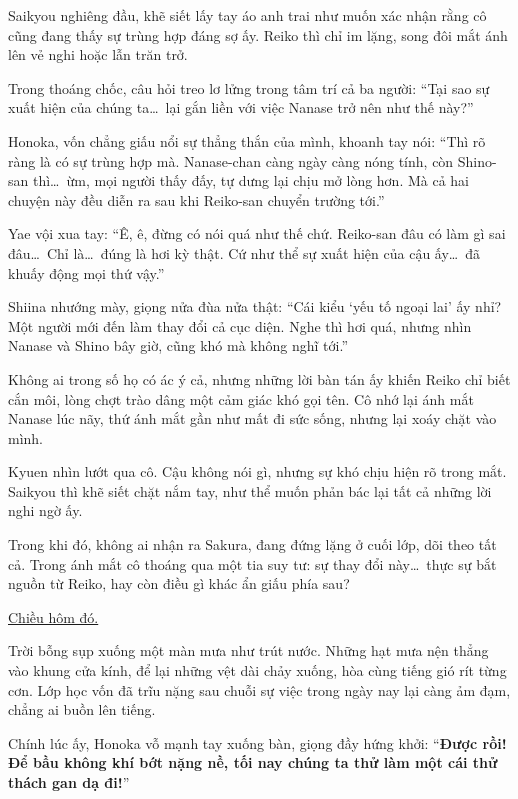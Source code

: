 \documentclass[../main.tex]{subfiles}
\begin{document}
Saikyou nghiêng đầu, khẽ siết lấy tay áo anh trai như muốn xác nhận rằng cô cũng đang thấy sự trùng hợp đáng sợ ấy. Reiko thì chỉ im lặng, song đôi mắt ánh lên vẻ nghi hoặc lẫn trăn trở.

Trong thoáng chốc, câu hỏi treo lơ lửng trong tâm trí cả ba người: ``Tại sao sự xuất hiện của chúng ta\dots\ lại gắn liền với việc Nanase trở nên như thế này?''

Honoka, vốn chẳng giấu nổi sự thẳng thắn của mình, khoanh tay nói: ``Thì rõ ràng là có sự trùng hợp mà. Nanase-chan càng ngày càng nóng tính, còn Shino-san thì\dots\ ừm, mọi người thấy đấy, tự dưng lại chịu mở lòng hơn. Mà cả hai chuyện này đều diễn ra sau khi Reiko-san chuyển trường tới.''

Yae vội xua tay: ``Ê, ê, đừng có nói quá như thế chứ. Reiko-san đâu có làm gì sai đâu\dots\ Chỉ là\dots\ đúng là hơi kỳ thật. Cứ như thể sự xuất hiện của cậu ấy\dots\ đã khuấy động mọi thứ vậy.''

Shiina nhướng mày, giọng nửa đùa nửa thật: ``Cái kiểu `yếu tố ngoại lai' ấy nhỉ? Một người mới đến làm thay đổi cả cục diện. Nghe thì hơi quá, nhưng nhìn Nanase và Shino bây giờ, cũng khó mà không nghĩ tới.''

Không ai trong số họ có ác ý cả, nhưng những lời bàn tán ấy khiến Reiko chỉ biết cắn môi, lòng chợt trào dâng một cảm giác khó gọi tên. Cô nhớ lại ánh mắt Nanase lúc nãy, thứ ánh mắt gần như mất đi sức sống, nhưng lại xoáy chặt vào mình.

Kyuen nhìn lướt qua cô. Cậu không nói gì, nhưng sự khó chịu hiện rõ trong mắt. Saikyou thì khẽ siết chặt nắm tay, như thể muốn phản bác lại tất cả những lời nghi ngờ ấy.

Trong khi đó, không ai nhận ra Sakura, đang đứng lặng ở cuối lớp, dõi theo tất cả. Trong ánh mắt cô thoáng qua một tia suy tư: sự thay đổi này\dots\ thực sự bắt nguồn từ Reiko, hay còn điều gì khác ẩn giấu phía sau?

\begin{center}
  \uline{Chiều hôm đó.}
\end{center}

Trời bỗng sụp xuống một màn mưa như trút nước. Những hạt mưa nện thẳng vào khung cửa kính, để lại những vệt dài chảy xuống, hòa cùng tiếng gió rít từng cơn. Lớp học vốn đã trĩu nặng sau chuỗi sự việc trong ngày nay lại càng ảm đạm, chẳng ai buồn lên tiếng.

Chính lúc ấy, Honoka vỗ mạnh tay xuống bàn, giọng đầy hứng khởi: ``\textbf{Được rồi! Để bầu không khí bớt nặng nề, tối nay chúng ta thử làm một cái thử thách gan dạ đi!}''
\end{document}
